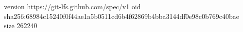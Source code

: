 version https://git-lfs.github.com/spec/v1
oid sha256:68984c15240f0f44ae1a5b0511cd6b4f62869b4bba3144df0e98c0b769c40bae
size 262240
